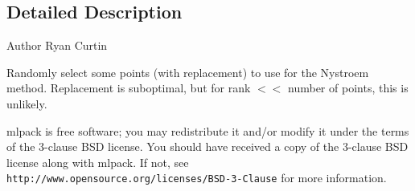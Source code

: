 \subsection{Detailed Description}
\begin{DoxyAuthor}{Author}
Ryan Curtin
\end{DoxyAuthor}
Randomly select some points (with replacement) to use for the Nystroem method. Replacement is suboptimal, but for rank $<$$<$ number of points, this is unlikely.

mlpack is free software; you may redistribute it and/or modify it under the terms of the 3-\/clause B\+SD license. You should have received a copy of the 3-\/clause B\+SD license along with mlpack. If not, see {\tt http\+://www.\+opensource.\+org/licenses/\+B\+S\+D-\/3-\/\+Clause} for more information. 